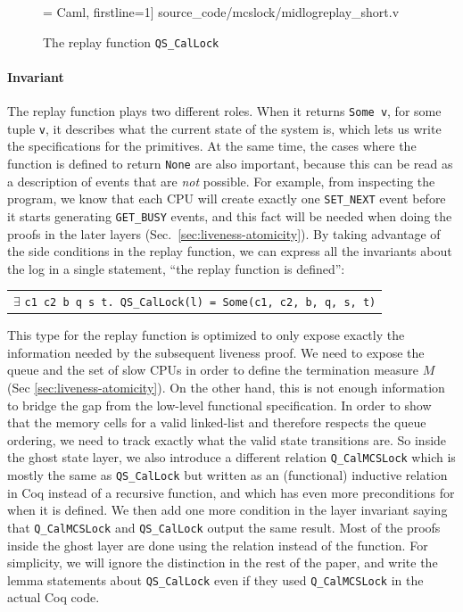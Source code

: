 \begin{figure}
 = Caml, firstline=1] {source_code/mcslock/midlogreplay_short.v}
\caption{The replay function \lstinline$QS_CalLock$}
\label{fig:QS_CalLock}
\end{figure}


\paragraph*{Invariant} The replay function plays two different roles. When it returns \lstinline$Some v$, for some tuple \lstinline$v$, it describes what the current state of the system is, which lets us write the specifications for the primitives. At the same time, the cases where the function is defined to return \lstinline$None$ are also important, because this can be read as a description of events that are \emph{not} possible. For example, from inspecting the program, we know that each CPU will create exactly one \lstinline$SET_NEXT$ event before it starts generating \lstinline$GET_BUSY$ events, and this fact will be needed when doing the proofs in the later layers (Sec.~\ref{sec:liveness-atomicity}). By taking advantage of  the side conditions in the replay function, we can express all the invariants about the log in a single statement, ``the replay function is defined'':
\begin{center}
\begin{tabular}{c}
$\exists$ \lstinline$c1 c2 b q s t. QS_CalLock(l) = Some(c1, c2, b, q, s, t)$\\
\end{tabular}
\end{center}


This type for the replay function is optimized to only expose exactly the information needed by the subsequent liveness proof. We need to expose the queue and the set of slow CPUs in order to define the termination measure $M$ (Sec \ref{sec:liveness-atomicity}). On the other hand, this is not enough information to bridge the gap from the low-level functional specification. In order to show that the memory cells for a valid linked-list and therefore respects the queue ordering, we need to track exactly what the valid state transitions are. So inside the ghost state layer, we also introduce a different relation  \lstinline$Q_CalMCSLock$ which is mostly the same as \lstinline$QS_CalLock$ but written as an (functional) inductive relation in Coq instead of a recursive function, and which has even more preconditions for when it is defined. We then add one more condition in the layer invariant saying that \lstinline$Q_CalMCSLock$ and \lstinline$QS_CalLock$ output the same result. Most of the proofs inside the ghost layer are done using the relation instead of the function. For simplicity, we will ignore the distinction in the rest of the paper, and write the lemma statements about \lstinline$QS_CalLock$ even if they used \lstinline$Q_CalMCSLock$ in the actual Coq code.


